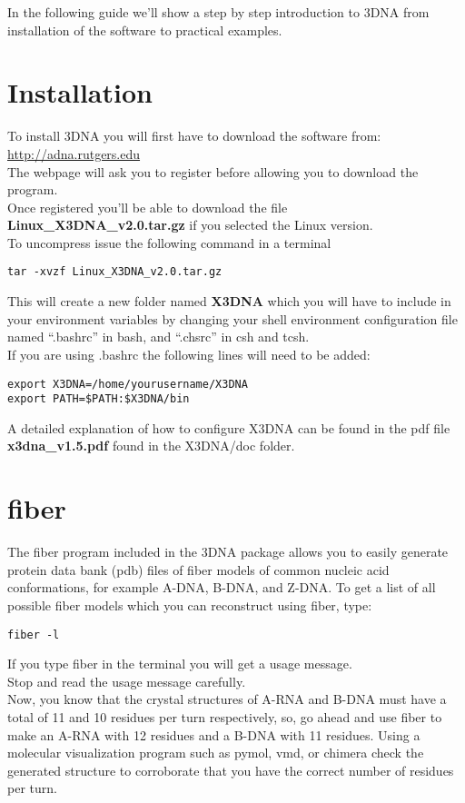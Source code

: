\maketitle

\label{basics}
In the following guide we'll show  a step by step introduction to 3DNA
from installation of the software to practical examples.

\section{Installation}
To install 3DNA you will first have to download the software from:\\

\url{http://adna.rutgers.edu}\\

\noindent The webpage will ask you to register before allowing you to
download the program.\\
Once   registered    you'll   be    able   to   download    the   file
\textbf{Linux\_X3DNA\_v2.0.tar.gz} if you  selected the Linux version.\\
To uncompress issue the following command in a terminal
\begin{Verbatim}
tar -xvzf Linux_X3DNA_v2.0.tar.gz
\end{Verbatim}
This will create a new folder named \textbf{X3DNA} which you will have
to  include  in your  environment  variables  by  changing your  shell
environment  configuration   file  named  ``.bashrc''   in  bash,  and
``.chsrc'' in csh and tcsh.\\ 
If you are using .bashrc the following lines will need to be added:
\begin{Verbatim}
export X3DNA=/home/yourusername/X3DNA
export PATH=$PATH:$X3DNA/bin
\end{Verbatim}
A detailed explanation  of how to configure X3DNA can  be found in the
pdf file \textbf{x3dna\_v1.5.pdf} found in the X3DNA/doc folder.

\section{fiber}
The \textrm{fiber} program included in  the 3DNA package allows you to
easily  generate  protein data  bank  (pdb)  files of  fiber
models of common nucleic acid conformations, for example A-DNA, B-DNA,
and Z-DNA.  To get a list of  all possible fiber models  which you can
reconstruct using \textrm{fiber}, type:
\begin{Verbatim}
fiber -l
\end{Verbatim}
If you type \textrm{fiber} in the terminal you  will get a usage
message.\\
Stop and read the usage message carefully.\\
Now, you  know that the crystal structures of A-RNA and B-DNA must
have a total of 11 and 10 residues per turn respectively, so, go ahead
and use  \textrm{fiber} to make  an A-RNA with  12 residues and  a B-DNA
with  11 residues.  Using a  molecular visualization  program  such as
pymol, vmd,  or chimera check  the generated structure  to corroborate
that you have the correct number of residues per turn.

